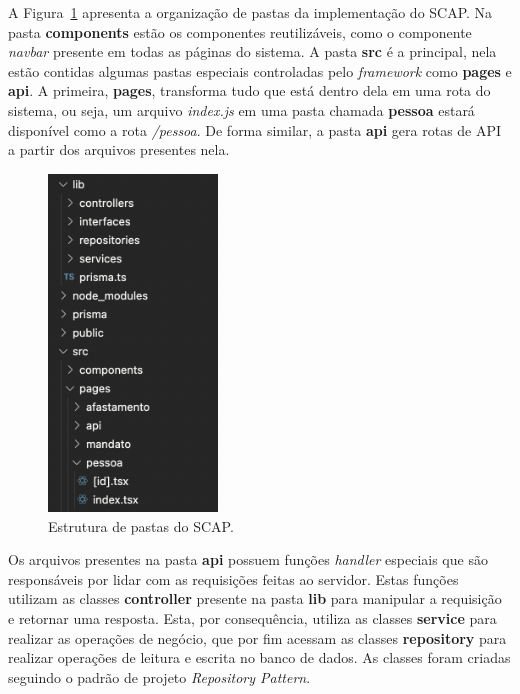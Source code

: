 
A Figura~\ref{fig-pastas} apresenta a organização de pastas da implementação do SCAP. 
Na pasta \textbf{components} estão os componentes reutilizáveis, como o componente \textit{navbar} presente em todas as páginas do sistema.
A pasta \textbf{src} é a principal, nela estão contidas algumas pastas especiais controladas pelo \textit{framework}
como \textbf{pages} e \textbf{api}. A primeira, \textbf{pages}, transforma tudo que está dentro dela em uma rota do sistema,
ou seja, um arquivo \textit{index.js} em uma pasta chamada \textbf{pessoa} estará disponível como a rota \textit{/pessoa}.
De forma similar, a pasta \textbf{api} gera rotas de API a partir dos arquivos presentes nela.


\begin{figure}
	\centering
	\includegraphics[width=0.4\textwidth]{figuras/fig-pastas.png}
	\caption{Estrutura de pastas do SCAP.}
	\label{fig-pastas}
\end{figure}

Os arquivos presentes na pasta \textbf{api} possuem funções \textit{handler} especiais que são responsáveis por lidar com as requisições feitas ao servidor.
Estas funções utilizam as classes \textbf{controller} presente na pasta \textbf{lib} para manipular a requisição e retornar uma resposta.
Esta, por consequência, utiliza as classes \textbf{service} para realizar as operações de negócio, que por fim acessam as classes \textbf{repository} para realizar
operações de leitura e escrita no banco de dados. As classes foram criadas seguindo o padrão de projeto \textit{Repository Pattern}.

